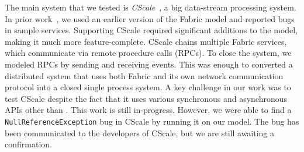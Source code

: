 
The main system that we tested is \emph{CScale}~\cite{faleiro2012},
a big data-stream processing system. In prior work~\cite{deligiannis2015psharp}, 
we used an earlier version of the Fabric model and reported bugs in sample services.
Supporting CScale required significant additions to the model, making it much more
feature-complete.
CScale chains multiple Fabric services, which communicate via remote procedure calls (RPCs).
To close the system, we modeled RPCs 
by sending and receiving \psharp{} events.
This was enough to converted a distributed system
that uses both Fabric and its own
network communication protocol
into 
a closed single process system. 
A key challenge in our work
was to test CScale despite the fact that it
uses various synchronous and asynchronous APIs
other than \psharp{}.
This work is still in-progress.
However, we were able to find a \texttt{NullReferenceException}
bug in CScale by running it on our model. The bug has been
communicated to the developers of CScale, but we are still awaiting a
confirmation.











